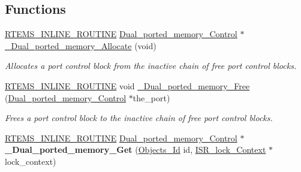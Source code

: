 \subsection*{Functions}
\begin{DoxyCompactItemize}
\item 
\mbox{\hyperlink{group__RTEMSScoreBaseDefs_gac216239df231d5dbd15e3520b0b9313f}{R\+T\+E\+M\+S\+\_\+\+I\+N\+L\+I\+N\+E\+\_\+\+R\+O\+U\+T\+I\+NE}} \mbox{\hyperlink{structDual__ported__memory__Control}{Dual\+\_\+ported\+\_\+memory\+\_\+\+Control}} $\ast$ \mbox{\hyperlink{group__ClassicDPMEMImpl_gad2aa8b47ec76c96c01f44b889756223b}{\+\_\+\+Dual\+\_\+ported\+\_\+memory\+\_\+\+Allocate}} (void)
\begin{DoxyCompactList}\small\item\em Allocates a port control block from the inactive chain of free port control blocks. \end{DoxyCompactList}\item 
\mbox{\hyperlink{group__RTEMSScoreBaseDefs_gac216239df231d5dbd15e3520b0b9313f}{R\+T\+E\+M\+S\+\_\+\+I\+N\+L\+I\+N\+E\+\_\+\+R\+O\+U\+T\+I\+NE}} void \mbox{\hyperlink{group__ClassicDPMEMImpl_ga66c62de25dd210c71cfdf3658738c930}{\+\_\+\+Dual\+\_\+ported\+\_\+memory\+\_\+\+Free}} (\mbox{\hyperlink{structDual__ported__memory__Control}{Dual\+\_\+ported\+\_\+memory\+\_\+\+Control}} $\ast$the\+\_\+port)
\begin{DoxyCompactList}\small\item\em Frees a port control block to the inactive chain of free port control blocks. \end{DoxyCompactList}\item 
\mbox{\label{group__ClassicDPMEMImpl_ga34b3b7bbc775ebd2c5a1c6c87b9e5872}} 
\mbox{\hyperlink{group__RTEMSScoreBaseDefs_gac216239df231d5dbd15e3520b0b9313f}{R\+T\+E\+M\+S\+\_\+\+I\+N\+L\+I\+N\+E\+\_\+\+R\+O\+U\+T\+I\+NE}} \mbox{\hyperlink{structDual__ported__memory__Control}{Dual\+\_\+ported\+\_\+memory\+\_\+\+Control}} $\ast$ {\bfseries \+\_\+\+Dual\+\_\+ported\+\_\+memory\+\_\+\+Get} (\mbox{\hyperlink{group__RTEMSScoreObject_ga5821f52a51072941bdd603e542d0863e}{Objects\+\_\+\+Id}} id, \mbox{\hyperlink{structISR__lock__Context}{I\+S\+R\+\_\+lock\+\_\+\+Context}} $\ast$lock\+\_\+context)
\end{DoxyCompactItemize}

